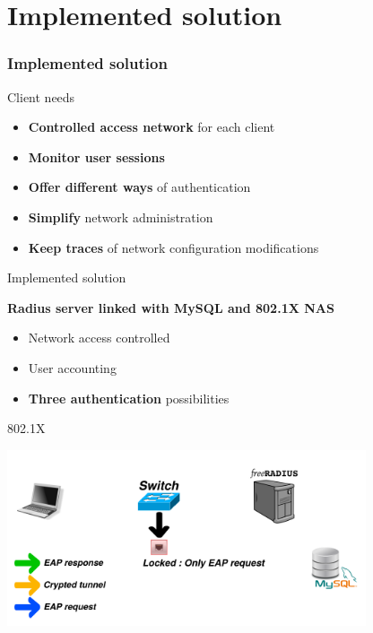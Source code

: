\documentclass[12pt]{beamer}
\begin{document}
\part{Implemented solution}
\frame{\partpage}
\section{Implemented solution}

\begin{frame}{Client needs}
    \begin{itemize}[<+->]
	\item \textbf{Controlled access network} for each client
	\vfill
	\item \textbf{Monitor user sessions}
	\vfill 
	\item \textbf{Offer different ways} of authentication
	\vfill
	\item \textbf{Simplify} network administration
	\vfill
	\item \textbf{Keep traces} of network configuration modifications
    \end{itemize}
\end{frame}

\begin{frame}{Implemented solution}
    \begin{center}
    \textbf{Radius server linked with MySQL and 802.1X NAS}
    \end{center}

    \pause
    \begin{itemize}[<+->]\vfill
	\item Network access controlled\vfill
	\item User accounting\vfill
	\item \textbf{Three authentication} possibilities\vfill
    \end{itemize}
\end{frame}

\begin{frame}{802.1X}
\vfill
\begin{center}
    \includegraphics[width=300pt]{img/dot1x_1.pdf}
\end{center}
\vfill
\end{frame}
\end{document}

